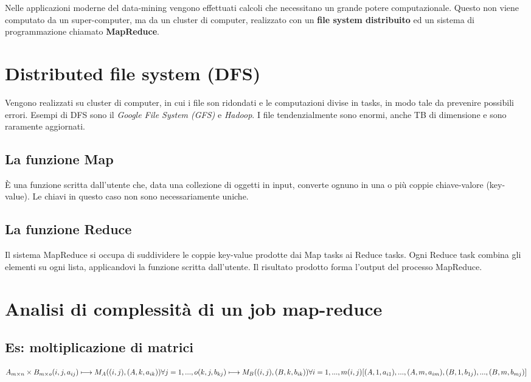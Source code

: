 \documentclass[\main/main.tex]{subfiles}
\begin{document}
Nelle applicazioni moderne del data-mining vengono effettuati calcoli che necessitano un grande potere computazionale. Questo non viene computato da un super-computer, ma da un cluster di computer, realizzato con un \textbf{file system distribuito} ed un sistema di programmazione chiamato \textbf{MapReduce}.

\section{Distributed file system (DFS)}
Vengono realizzati su cluster di computer, in cui i file son ridondati e le computazioni divise in tasks, in modo tale da prevenire possibili errori. Esempi di DFS sono il \textit{Google File System (GFS)} e \textit{Hadoop}. I file tendenzialmente sono enormi, anche TB di dimensione e sono raramente aggiornati.

\subsection{La funzione Map}
È una funzione scritta dall'utente che, data una collezione di oggetti in input, converte ognuno in una o più coppie chiave-valore (key-value). Le chiavi in questo caso non sono necessariamente uniche.

\subsection{La funzione Reduce}
Il sistema MapReduce si occupa di suddividere le coppie key-value prodotte dai Map tasks ai Reduce tasks. Ogni Reduce task combina gli elementi su ogni lista, applicandovi la funzione scritta dall'utente. Il risultato prodotto forma l'output del processo MapReduce.

\section{Analisi di complessità di un job map-reduce}

\subsection{Es: moltiplicazione di matrici}

\[
	A_{m\times n} \times B_{m \times o} \\
	(i,j,a_{ij}) \longmapsto{M_A} ((i,j), (A, k, a_{ik})) \forall j = 1,...,o \\
	(k,j,b_{kj}) \longmapsto{M_B} ((i,j), (B, k, b_{ik})) \forall i = 1,...,m \\
	(i,j)[(A, 1, a_{i1}), ..., (A, m, a_{im}), (B, 1, b_{1j}), ..., (B, m, b_{mj})]
\]
\end{document}
